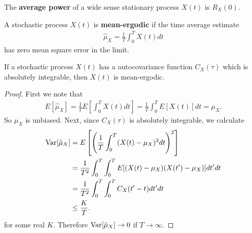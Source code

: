 \documentclass{memoir}
\begin{document}
\begin{definition}
    The \textbf{average power} of a wide sense stationary process $X(t)$ is $R_X(0)$.
\end{definition}

\begin{definition}
    A stochastic process $X(t)$ is \textbf{mean-ergodic} if the time average estimate
    \begin{align*}
        \hat{\mu}_X = \frac{1}{T} \int_0^T X(t) dt
    \end{align*}
    has zero mean square error in the limit.
\end{definition}

\begin{theorem}
    If a stochastic process $X(t)$ has a autocovariance function $C_X(\tau)$ which is absolutely integrable, then $X(t)$ is mean-ergodic.
\end{theorem}
\begin{proof}
    First we note that
    \begin{align*}
        E[\hat{\mu}_X] = \frac{1}{T} E\left[\int_0^T X(t) dt\right] = \frac{1}{T} \int_0^T E[X(t)] dt= \mu_X.
    \end{align*}
    So $\mu_X$ is unbiased. Next, since $C_X(\tau)$ is absolutely integrable, we calculate
    \begin{align*}
        \operatorname{Var}[\hat{\mu}_X] &= E\left[\left(\frac{1}{T}\int_0^T (X(t) - \mu_X)^2 dt\right)^2\right] \\
        &= \frac{1}{T^2} \int_0^T \int_0^T E[(X(t)-\mu_X)(X(t')-\mu_X)]dt' dt \\
        &= \frac{1}{T^2} \int_0^T \int_0^T C_X(t' - t)dt' dt \\
        &\le \frac{K}{T}.
    \end{align*}
    for some real $K$. Therefore $\operatorname{Var}[\hat{\mu}_X] \to 0$ if $T \to \infty$.
\end{proof}
\end{document}
